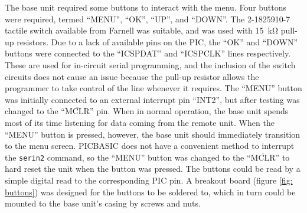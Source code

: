 The base unit required some buttons to interact with the menu. Four buttons were required, termed ``MENU'', ``OK'', ``UP'', and ``DOWN''. The 2-1825910-7 tactile switch \cite{buttons} available from Farnell was suitable, and was used with \SI{15}{\kilo\ohm} pull-up resistors. Due to a lack of available pins on the PIC, the ``OK'' and ``DOWN'' buttons were connected to the ``ICSPDAT'' and ``ICSPCLK'' lines respectively. These are used for in-circuit serial programming, and the inclusion of the switch circuits does not cause an issue because the pull-up resistor allows the programmer to take control of the line whenever it requires. The ``MENU'' button was initially connected to an external interrupt pin ``INT2'', but after testing was changed to the ``$\overline{\text{MCLR}}$'' pin. When in normal operation, the base unit spends most of its time listening for data coming from the remote unit. When the ``MENU'' button is pressed, however, the base unit should immediately transition to the menu screen. PICBASIC does not have a convenient method to interrupt the \verb|serin2| command, so the ``MENU'' button was changed to the ``$\overline{\text{MCLR}}$'' to hard reset the unit when the button was pressed. The buttons could be read by a simple digital read to the corresponding PIC pin. A breakout board (figure \ref{fig: buttons}) was designed for the buttons to be soldered to, which in turn could be mounted to the base unit's casing by screws and nuts.\\









